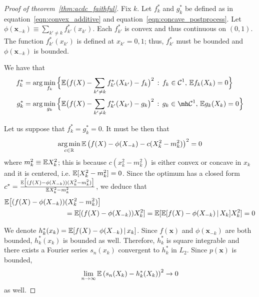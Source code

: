 \begin{proof}[Proof of theorem~\ref{thm:acdc_faithful}]

Fix $k$. Let $f^*_k$ and $g^*_k$ be defined as in
equation~\ref{eqn:convex_additive} and
equation~\ref{eqn:concave_postprocess}. Let $\phi(\mathbf{x}_{-k})
\equiv \sum_{k' \neq k} f^*_{k'}(x_{k'})$. Each $f^*_{k'}$ is convex
and thus continuous on $(0,1)$. The function $f^*_{k'}(x_{k'})$ is defined at
$x_{k'} = 0,1$; thus, $f^*_{k'}$ must be bounded and
$\phi(\mathbf{x}_{-k})$ is bounded.

We have that
\begin{align}
f^*_k &= \arg\min_{f_k} \Big\{
   \E\big( f(X) - \sum_{k' \neq k} f^*_{k'}(X_{k'}) - f_k \big)^2 
    \,:\, f_k \in  \mathcal{C}^1,\, \E f_k(X_k) = 0 
  \Big\} \\
g^*_k &= \arg\min_{g_k} \Big\{
   \E\big( f(X) - \sum_{k' \neq k} f^*_{k'}(X_{k'}) - g_k \big)^2 
    \,:\, g_k \in \mh \mathcal{C}^1,\, \E g_k(X_k) = 0 
  \Big\}
\end{align}

Let us suppose that $f^*_k = g^*_k = 0$. It must be then that
\begin{align*}
\mathop{\text{\rm arg\,min}}_{c \in {\mathbb R}} {\mathbb E} \left( f(X) - \phi(X_{-k}) - c (X_k^2 - m_k^2) \right)^2 = 0
\end{align*}
where $m_k^2 \equiv {\mathbb E} X_k^2$; this is because $c(x_k^2 - m_k^2)$ is either convex or concave in $x_k$ and it is centered, i.e. ${\mathbb E}[ X_k^2 - m_k^2] = 0$. Since the optimum has a closed form $c^* = \frac{{\mathbb E}\big[(f(X) -\phi(X_{-k}))(X_k^2 - m^2_k)\big]}{{\mathbb E} X_k^2 - m^2_k}$, we deduce that 
\begin{align*}
{\mathbb E} \big[ (f(X) - \phi(X_{-k})) &(X_k^2 - m_k^2) \big] \\
   &= {\mathbb E}[ (f(X) - \phi(X_{-k})) X^2_k] = 
 {\mathbb E}[ {\mathbb E}[ f(X) - \phi(X_{-k}) {\,|\,} X_k] X^2_k] = 0
\end{align*}

We denote $h^*_k(x_k) = {\mathbb E}[ f(X) - \phi(X_{-k}) {\,|\,}
  x_k]$.  Since $f(\mathbf{x})$ and $\phi(\mathbf{x}_{-k})$ are both bounded,
$h^*_k(x_k)$ is bounded as well. Therefore, $h^*_k$ is square
integrable and there exists a Fourier series $s_n(x_k)$ convergent to
$h^*_k$ in $L_2$. Since $p(\mathbf{x})$ is bounded, $$\lim_{n
  \rightarrow \infty} {\mathbb E} \left( s_n(X_k) - h^*_k(X_k ) \right)^2
\rightarrow 0$$ as well.



\end{proof}
